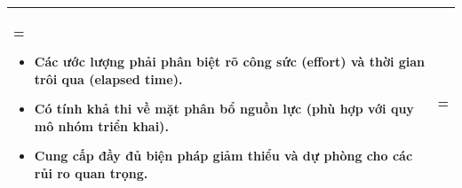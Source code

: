 \documentclass{article}
\begin{document}
\begin{table}[H]
\begin{tabularx}{\textwidth}{|>{\hsize=0.5\hsize\linewidth=\hsize\bfseries}X|>{\hsize=1.5\hsize\linewidth=\hsize}X|}
\begin{itemize}[leftmargin=*, nosep]
            \item Các ước lượng phải phân biệt rõ công sức (effort) và thời gian trôi qua (elapsed time).
            \item Có tính khả thi về mặt phân bổ nguồn lực (phù hợp với quy mô nhóm triển khai).
            \item Cung cấp đầy đủ biện pháp giảm thiểu và dự phòng cho các rủi ro quan trọng.
        \end{itemize}
        \vspace{-1em} \\
        \hline
    \end{tabularx}
\end{table}

\clearpage
\end{document}
